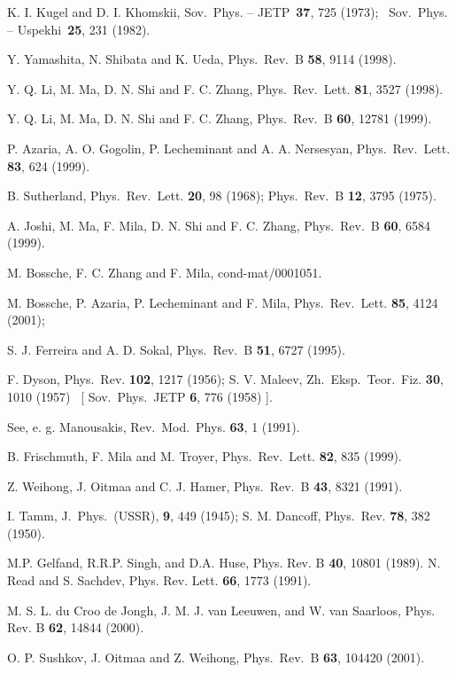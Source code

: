 \begin{references}
K. I. Kugel and D. I. Khomskii, 
Sov.\ Phys. -- JETP\ {\bf 37}, 725 (1973);
\ Sov.\ Phys. -- Uspekhi\ {\bf 25}, 231 (1982).

Y. Yamashita, N. Shibata and K. Ueda, 
Phys.\ Rev.\ B {\bf 58}, 9114 (1998).

Y. Q. Li, M. Ma, D. N. Shi and F. C. Zhang,
Phys.\ Rev.\ Lett. {\bf 81}, 3527 (1998).

Y. Q. Li, M. Ma, D. N. Shi and F. C. Zhang, 
Phys.\ Rev.\ B {\bf 60}, 12781 (1999).

P. Azaria, A. O. Gogolin, P. Lecheminant and A. A. Nersesyan, 
Phys.\ Rev.\ Lett. {\bf 83}, 624 (1999).

B. Sutherland, 
Phys.\ Rev.\ Lett. {\bf 20}, 98 (1968); 
Phys.\ Rev.\ B {\bf 12}, 3795 (1975).

A. Joshi, M. Ma, F. Mila, D. N. Shi and F. C. Zhang,
Phys.\ Rev.\ B {\bf 60}, 6584 (1999).

M. Bossche, F. C. Zhang and F. Mila, 
cond-mat/0001051.

M. Bossche, P. Azaria, P. Lecheminant and F. Mila, 
Phys.\ Rev.\ Lett. {\bf 85}, 4124 (2001); 

S. J. Ferreira and A. D. Sokal,
Phys.\ Rev.\ B {\bf 51}, 6727 (1995).

F. Dyson,
Phys.\ Rev. {\bf 102}, 1217 (1956); 
\hskip 2mm
S. V. Maleev,
Zh.\ Eksp.\ Teor.\ Fiz. {\bf 30}, 1010 (1957) \
[ Sov.\ Phys.\ JETP {\bf 6}, 776 (1958) ].

See, e. g. Manousakis, 
Rev.\ Mod.\ Phys. {\bf 63}, 1 (1991).

B. Frischmuth, F. Mila and M. Troyer,
Phys.\ Rev.\ Lett. {\bf 82}, 835 (1999).

Z. Weihong, J. Oitmaa and C. J. Hamer,
Phys.\ Rev.\ B {\bf 43}, 8321 (1991).

I. Tamm, 
J.\ Phys.\ (USSR), {\bf 9}, 449 (1945); 
S. M. Dancoff,
Phys.\ Rev. {\bf 78}, 382 (1950).

 M.P. Gelfand, R.R.P. Singh, and D.A. Huse,
 Phys. Rev. B  {\bf 40}, 10801 (1989).
 N. Read and S. Sachdev, Phys. Rev. Lett.
{\bf 66}, 1773 (1991).

 M. S. L. du Croo de Jongh, J. M. J. van Leeuwen,
and W. van Saarloos, Phys. Rev. B {\bf 62}, 14844 (2000).

O. P. Sushkov, J. Oitmaa and Z. Weihong,
Phys.\ Rev.\ B {\bf 63}, 104420 (2001).

\end{references}


